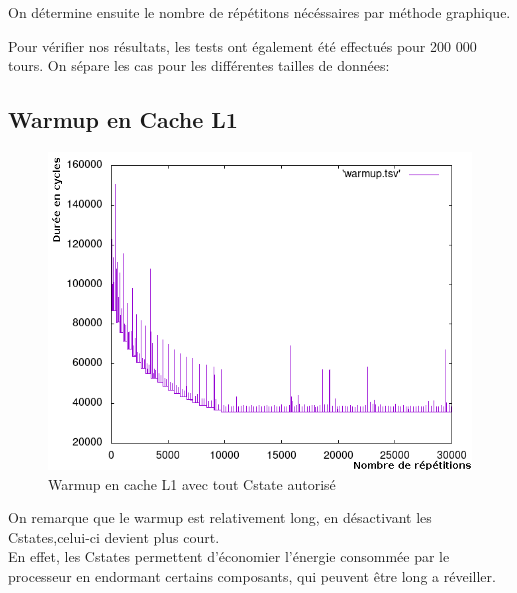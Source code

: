 \documentclass[a4paper]{report}
\begin{document}
On détermine ensuite le nombre de répétitons nécéssaires par méthode graphique.

Pour vérifier nos résultats, les tests ont également été effectués pour 200 000 tours.
On sépare les cas pour les différentes tailles de données:

\newpage
\subsection*{Warmup en Cache L1}
    \begin{figure}[ht!]
        \centering
        \includegraphics[width=120mm]{MEDIA/warmupL1_Cstate.png}
        \caption{Warmup en cache L1 avec tout Cstate autorisé}
    \end{figure}

On remarque que le warmup est relativement long, en désactivant les Cstates,celui-ci devient plus court.\\

En effet, les Cstates permettent d'économier l'énergie consommée par le processeur en endormant certains composants, qui peuvent être long a réveiller.\\
\end{document}
